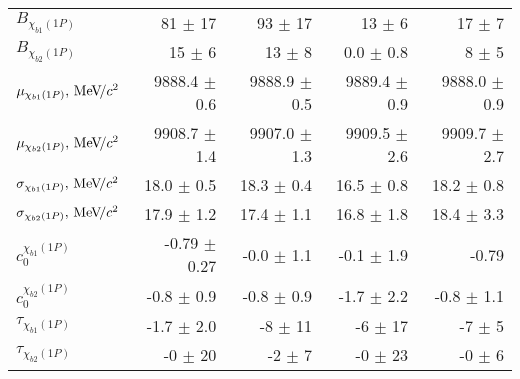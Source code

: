 \begin{table}[H]
{{\begin{tabular}{lrrrr}
\rule{0pt}{4ex}$B_{\chi_{b1}(1P)}$ & 81 $\pm$ 17 & 93 $\pm$ 17 & 13 $\pm$ 6 & 17 $\pm$ 7\\
$B_{\chi_{b2}(1P)}$ & 15 $\pm$ 6 & 13 $\pm$ 8 & 0.0 $\pm$ 0.8 & 8 $\pm$ 5\\

\rule{0pt}{4ex}$\mu_{\chi_{b1}(1P)}, {\mathrm{\,Me\kern -0.1em V\!/}c^2}$ & 9888.4 $\pm$ 0.6 & 9888.9 $\pm$ 0.5 & 9889.4 $\pm$ 0.9 & 9888.0 $\pm$ 0.9\\
$\mu_{\chi_{b2}(1P)}, {\mathrm{\,Me\kern -0.1em V\!/}c^2}$ & 9908.7 $\pm$ 1.4 & 9907.0 $\pm$ 1.3 & 9909.5 $\pm$ 2.6 & 9909.7 $\pm$ 2.7\\

\rule{0pt}{4ex}$\sigma_{\chi_{b1}(1P)}, {\mathrm{\,Me\kern -0.1em V\!/}c^2}$ & 18.0 $\pm$ 0.5 & 18.3 $\pm$ 0.4 & 16.5 $\pm$ 0.8 & 18.2 $\pm$ 0.8\\
$\sigma_{\chi_{b2}(1P)}, {\mathrm{\,Me\kern -0.1em V\!/}c^2}$ & 17.9 $\pm$ 1.2 & 17.4 $\pm$ 1.1 & 16.8 $\pm$ 1.8 & 18.4 $\pm$ 3.3\\

\rule{0pt}{4ex}$c_0^{\chi_{b1}(1P)}$ & -0.79 $\pm$ 0.27 & -0.0 $\pm$ 1.1 & -0.1 $\pm$ 1.9 & -0.79\\
$c_0^{\chi_{b2}(1P)}$ & -0.8 $\pm$ 0.9 & -0.8 $\pm$ 0.9 & -1.7 $\pm$ 2.2 & -0.8 $\pm$ 1.1\\

\rule{0pt}{4ex}$\tau_{\chi_{b1}(1P)}$ & -1.7 $\pm$ 2.0 & -8 $\pm$ 11 & -6 $\pm$ 17 & -7 $\pm$ 5\\
$\tau_{\chi_{b2}(1P)}$ & -0 $\pm$ 20 & -2 $\pm$ 7 & -0 $\pm$ 23 & -0 $\pm$ 6\\
\bottomrule
\end{tabular}
} %

} %
\label{tab:mc:chib1p_ups1s:fits}
\end{table}

